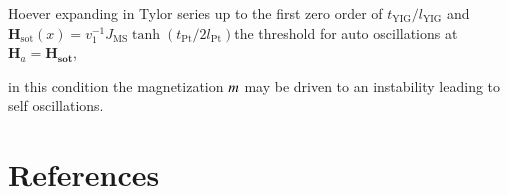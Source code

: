 \documentclass[review]{elsarticle}
\begin{document}
 Hoever expanding in Tylor series up to the first zero order of $t_{\mathrm{\scriptstyle{YIG}}}/l_{\mathrm{\scriptstyle{YIG}}}$  and  $\mathbf{H}_{\mathrm{\scriptstyle{sot}}}(x) =v_1^{-1} 
 J_{\mathrm{\scriptstyle{MS}}}\tanh(t_{\mathrm{\scriptstyle{Pt}}}/2 l_{\mathrm{\scriptstyle{Pt}}}) $the threshold for 
 auto oscillations at  $\mathbf{H}_{a}=\mathbf{H}_{\mathbf{\scriptstyle{sot}}}$, 
 
in this condition the magnetization $\boldmath{m}$  may be driven to an instability leading to self oscillations.  

\section*{References}


\end{document}
